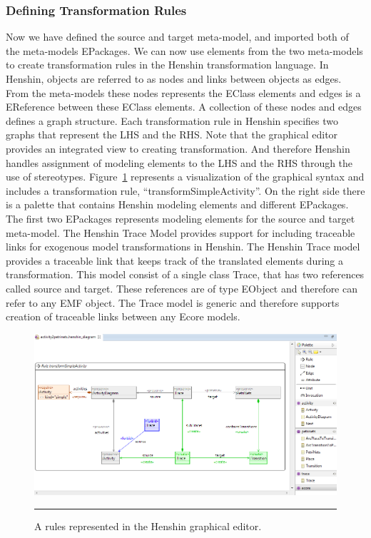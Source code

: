 \subsubsection*{Defining Transformation Rules}

Now we have defined the source and target meta-model, and imported
both of the meta-models EPackages. We can now use elements from the two
meta-models to create transformation rules in the Henshin transformation
language. In Henshin, objects are referred to as nodes and links between objects
as edges. From the meta-models these nodes represents the EClass elements and
edges is a EReference between these EClass elements. A collection of these
nodes and edges defines a graph structure. Each transformation rule in Henshin
specifies two graphs that represent the LHS and the RHS. Note that the
graphical editor provides an integrated view to creating transformation. And
therefore Henshin handles assignment of modeling elements to the LHS and the
RHS through the use of stereotypes. Figure~\ref{fig:HenshinScreen} represents a
visualization of the graphical syntax and includes a transformation rule,
``transformSimpleActivity''. On the right side there is a palette that contains
Henshin modeling elements and different EPackages. The first two EPackages
represents modeling elements for the source and target meta-model. The Henshin
Trace Model provides support for including traceable links for exogenous model
transformations in Henshin. The Henshin Trace model provides a traceable link
that keeps track of the translated elements during a transformation. This model
consist of a single class Trace, that has two references called source and
target. These references are of type EObject and therefore can refer to any EMF
object. The Trace model is generic and therefore supports creation of traceable
links between any Ecore models.

\begin{figure}[H]
	\centering
	\includegraphics[scale=0.6]{figures/henshin_scren_2}
	\rule{35em}{0.5pt}
	\caption[The Henshin graphical editor]
	{A rules represented in the Henshin graphical editor.}
	\label{fig:HenshinScreen}
\end{figure}


